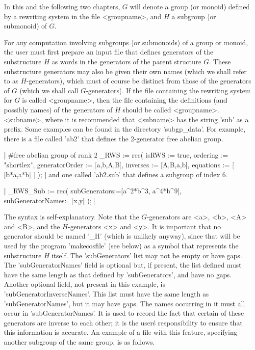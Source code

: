 
In this and the following two chapters, $G$ will denote a group (or
monoid) defined by a rewriting system in the file <groupname>, and $H$ a
subgroup (or submonoid) of $G$.

For any computation involving subgroups (or submonoids) of
a group or monoid, the user must first prepare an input file that
defines generators of the substructure $H$ as words in the generators of
the parent structure $G$.  These substructure generators may also be given
their own names (which we shall refer to as $H$-generators), which must
of course be distinct from those of the generators of $G$ (which we shall
call $G$-generators). If the file containing the rewriting system for $G$ is
called <groupname>, then the file containing the definitions (and possibly
names) of the generators of $H$ should be called <groupname>.<subname>, where
it is recommended that <subname> has the string 'sub' as a prefix. Some
examples can be found in the directory 'subgp\_data'. For example, there is a
file called 'ab2' that defines the 2-generator free abelian group.

|
#free abelian group of rank 2
_RWS := rec(
  isRWS := true,
  ordering := "shortlex",
  generatorOrder := [a,b,A,B],
  inverses := [A,B,a,b],
  equations := [ [b*a,a*b] ]
);
|
and one called 'ab2.sub' that defines a subgroup of index 6.

|
_RWS_Sub := rec(
  subGenerators:=[a^2*b^3, a^4*b^9],
  subGeneratorNames:=[x,y]
);
|

The syntax is self-explanatory. Note that the $G$-generators are <a>, <b>,
<A> and <B>, and the $H$-generators <x> and <y>.
It is important that no generator should be named '\_H' (which is
unlikely anyway), since that will be used by the program 'makecosfile'
(see below) as a symbol that represents the substructure $H$ itself.
The 'subGenerators' list may not be empty or have gaps.
The 'subGeneratorNames' field is optional but, if present, the list defined
must have the same length as that defined by 'subGenerators', and have no gaps.
Another optional field, not present in this example, is
'subGeneratorInverseNames'. This list must have the same length as
'subGeneratorNames', but it may have gaps. The names occurring in it
must all occur in 'subGeneratorNames'. It is used to record the fact that
certain of these generators are inverse to each other; it is the
user\'s responsibility to ensure that this information is accurate.
An example of a file with this feature, specifying another subgroup of the same
group, is as follows.

